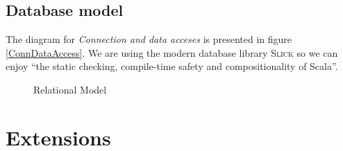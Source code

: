 \documentclass[a4paper,09pt]{article}
\begin{document}
\subsection{Database model}


The diagram for \textit{Connection and data acceses} is presented in figure
\ref{ConnDataAccess}.
We are using the modern database library \textsc{Slick} so we can enjoy
``the static checking, compile-time safety and compositionality of Scala''.

\begin{sidewaysfigure}
  
  \caption{Relational Model}
  \label{RELMODEL}
\end{sidewaysfigure}

\section{Extensions}
\end{document}
